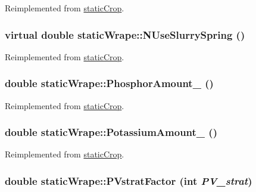 Reimplemented from \hyperlink{classstatic_crop_a6b89d7839db435c7ceafa2755312182e}{staticCrop}.\hypertarget{classstatic_wrape_a12cfad03bdf4d12b10f6c2a35329e7f9}{
\subsubsection[{NUseSlurrySpring}]{\setlength{\rightskip}{0pt plus 5cm}virtual double staticWrape::NUseSlurrySpring ()}}
\label{classstatic_wrape_a12cfad03bdf4d12b10f6c2a35329e7f9}


Reimplemented from \hyperlink{classstatic_crop_ae7d21ab4afc8d8355d231566e8d87b1b}{staticCrop}.\hypertarget{classstatic_wrape_acd42c532d438b9f9ed0a57bf83bdf2bc}{
\subsubsection[{PhosphorAmount\_\-}]{\setlength{\rightskip}{0pt plus 5cm}double staticWrape::PhosphorAmount\_\- ()}}
\label{classstatic_wrape_acd42c532d438b9f9ed0a57bf83bdf2bc}


Reimplemented from \hyperlink{classstatic_crop_abaa5c59d4074d47dedc79172f8326e08}{staticCrop}.\hypertarget{classstatic_wrape_a403c34aa6870748b3357f3f69b183824}{
\subsubsection[{PotassiumAmount\_\-}]{\setlength{\rightskip}{0pt plus 5cm}double staticWrape::PotassiumAmount\_\- ()}}
\label{classstatic_wrape_a403c34aa6870748b3357f3f69b183824}


Reimplemented from \hyperlink{classstatic_crop_a41fee98d728c7670e6acb504a9b3459d}{staticCrop}.\hypertarget{classstatic_wrape_a33e17fbd72287a058011486c611abdf8}{
\subsubsection[{PVstratFactor}]{\setlength{\rightskip}{0pt plus 5cm}double staticWrape::PVstratFactor (int {\em PV\_\-strat})}}
\label{classstatic_wrape_a33e17fbd72287a058011486c611abdf8}


